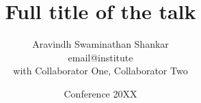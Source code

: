\title[Short title]{Full title of the talk}
\author[A. S. Shankar]{Aravindh Swaminathan Shankar \\[2pt] {\footnotesize email@institute}\\[4pt]
{\scriptsize with Collaborator One, Collaborator Two}}
\date[CONF 20XX]{Conference 20XX}


\newcommand{\ft}[1]{\vspace*{0.25cm}\textbf{#1}\smallskip\par\noindent{\color{mygray}\rule[1.0ex]{\linewidth}{0.5pt}}\vspace*{-0.35cm}}
\newcommand{\tk}[1]{\par\vfill\noindent\colorbox{LightGray}{\parbox{\dimexpr\linewidth-2\fboxsep}{\centering\small #1}}\vspace*{-0.2cm}}
